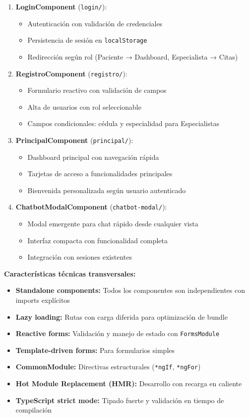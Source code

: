 \documentclass[12pt,a4paper]{report}
\numberwithin{figure}{section}
\begin{document}
\begin{enumerate}
  \item \textbf{LoginComponent} (\texttt{login/}):
  \begin{itemize}
    \item Autenticación con validación de credenciales
    \item Persistencia de sesión en \texttt{localStorage}
    \item Redirección según rol (Paciente → Dashboard, Especialista → Citas)
  \end{itemize}
  
  \item \textbf{RegistroComponent} (\texttt{registro/}):
  \begin{itemize}
    \item Formulario reactivo con validación de campos
    \item Alta de usuarios con rol seleccionable
    \item Campos condicionales: cédula y especialidad para Especialistas
  \end{itemize}
  
  \item \textbf{PrincipalComponent} (\texttt{principal/}):
  \begin{itemize}
    \item Dashboard principal con navegación rápida
    \item Tarjetas de acceso a funcionalidades principales
    \item Bienvenida personalizada según usuario autenticado
  \end{itemize}
  
  \item \textbf{ChatbotModalComponent} (\texttt{chatbot-modal/}):
  \begin{itemize}
    \item Modal emergente para chat rápido desde cualquier vista
    \item Interfaz compacta con funcionalidad completa
    \item Integración con sesiones existentes
  \end{itemize}
\end{enumerate}

\textbf{Características técnicas transversales:}
\begin{itemize}
  \item \textbf{Standalone components:} Todos los componentes son independientes con imports explícitos
  \item \textbf{Lazy loading:} Rutas con carga diferida para optimización de bundle
  \item \textbf{Reactive forms:} Validación y manejo de estado con \texttt{FormsModule}
  \item \textbf{Template-driven forms:} Para formularios simples
  \item \textbf{CommonModule:} Directivas estructurales (\texttt{*ngIf}, \texttt{*ngFor})
  \item \textbf{Hot Module Replacement (HMR):} Desarrollo con recarga en caliente
  \item \textbf{TypeScript strict mode:} Tipado fuerte y validación en tiempo de compilación
\end{itemize}
\end{document}
